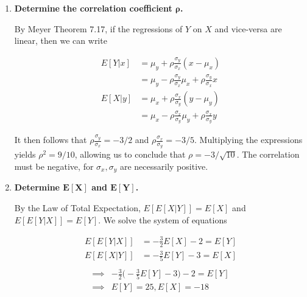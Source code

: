 \documentclass[10pt, oneside]{article}   	%
\theoremstyle{definition}
\begin{document}
\begin{enumerate}[label=7.\arabic*]
	\begin{enumerate}
	\item  \begin{tcolorbox}[
	  colback=Cerulean!5!white,
	  colframe=Cerulean!75!black]
	  \textbf{Determine the correlation coefficient $\bm{\rho}$.}
	  \end{tcolorbox}
	  
	  By Meyer Theorem 7.17, if the regressions of $Y$ on $X$ and vice-versa are linear, then we can write
	  
	  \begin{align*}
	  E[Y | x] &= \mu_y + \rho \frac{\sigma_y}{\sigma_x} (x - \mu_x) \\
	  &= \mu_y - \rho \frac{\sigma_y}{\sigma_x} \mu_x + \rho \frac{\sigma_y}{\sigma_x} x \\
	  E[X | y] &= \mu_x + \rho \frac{\sigma_x}{\sigma_y} (y - \mu_y) \\
	  &= \mu_x - \rho \frac{\sigma_x}{\sigma_y} \mu_y + \rho \frac{\sigma_x}{\sigma_y} y
	  \end{align*}
	  
	  It then follows that $\rho \frac{\sigma_y}{\sigma_x} = -3/2$ and $\rho \frac{\sigma_x}{\sigma_y} = -3/5$. Multiplying the expressions yields $\rho^2 = 9/10$, allowing us to conclude that $\boxed{ \rho = -3 / \sqrt{10} }$. The correlation must be negative, for $\sigma_x, \sigma_y$ are necessarily positive.
	  
	\item  \begin{tcolorbox}[
	  colback=Cerulean!5!white,
	  colframe=Cerulean!75!black]
	  \textbf{Determine $\bm{E[X]}$ and $\bm{E[Y]}$.}
	  \end{tcolorbox}
	  
	  By the Law of Total Expectation, $E[E[X | Y]] = E[X]$ and $E[E[Y | X]] = E[Y]$. We solve the system of equations
	  
	  \begin{align*}
	  E[E[Y | X]] &= -\frac{3}{2} E[X] - 2 = E[Y] \\
	  E[E[X | Y]] &= -\frac{3}{5} E[Y] - 3 = E[X] \\
	  \end{align*}
	  \begin{align*}
	  \implies &-\frac{3}{2} \Big( -\frac{3}{5} E[Y] - 3 \Big) - 2 = E[Y] \\
	  \implies &\boxed{E[Y] = 25, E[X] = -18}
	  \end{align*}
	  

\end{enumerate}
\end{enumerate}
\end{document}

